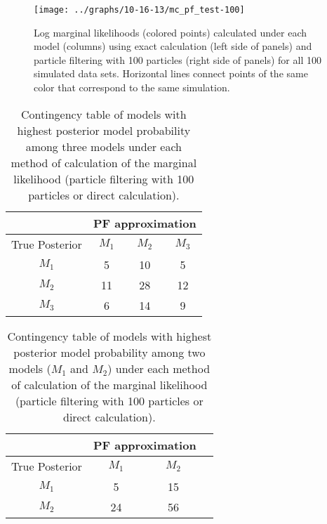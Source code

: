\documentclass{article}
\begin{document}
\begin{figure}
\texttt{[image: ../graphs/10-16-13/mc\_pf\_test-100]}
\caption{Log marginal likelihoods (colored points) calculated under each model (columns) using exact calculation (left side of panels) and particle filtering with 100 particles (right side of panels) for all 100 simulated data sets. Horizontal lines connect points of the same color that correspond to the same simulation.} \label{fig:logliks}
\end{figure}

\begin{table}
\begin{center}
\caption{Contingency table of models with highest posterior model probability among three models under each method of calculation of the marginal likelihood (particle filtering with 100 particles or direct calculation).} \label{tab:3mod100}
\begin{tabular}{|c|c|c|c|}
\hline
 & \multicolumn{3}{|c|}{PF approximation} \\
 \hline
 True Posterior & $M_1$& $M_2$ & $M_3$ \\
 \hline
 $M_1$ & 5 & 10 & 5 \\
 \hline
 $M_2$ & 11 & 28 & 12 \\
 \hline
 $M_3$ & 6 & 14 & 9 \\

 \hline
\end{tabular}
\end{center}
\end{table}

\begin{table}
\begin{center}
\caption{Contingency table of models with highest posterior model probability among two models ($M_1$ and $M_2$) under each method of calculation of the marginal likelihood (particle filtering with 100 particles or direct calculation).} \label{tab:12mod100}
\begin{tabular}{|c|c|c|c|}
\hline
 & \multicolumn{2}{|c|}{PF approximation} \\
 \hline
 True Posterior & $M_1$& $M_2$  \\
 \hline
 $M_1$ & 5 & 15  \\
 $M_2$ & 24 & 56 \\
 \hline
\end{tabular}
\end{center}
\end{table}
\end{document}
